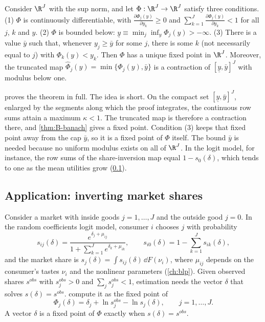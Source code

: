 \begin{theorem}\label{thm:B-blp-contraction}
Consider $\R^J$ with the sup norm, and let $\Phi: \R^J \to \R^J$ satisfy three conditions. (1) $\Phi$ is
continuously differentiable, with $\frac{\partial\Phi_j(y)}{\partial y_k} \geq 0$ and $\sum_{k=1}^{J}
\frac{\partial\Phi_j(y)}{\partial y_k} < 1$ for all $j$, $k$ and $y$. (2) $\Phi$ is bounded below:
$\underline y \equiv \min_j\inf_y\Phi_j(y) > -\infty$. (3) There is a value $\bar y$ such that, whenever $y_j
\geq \bar y$ for some $j$, there is some $k$ (not necessarily equal to $j$) with $\Phi_k(y) < y_k$. Then
$\Phi$ has a unique fixed point in $\R^J$. Moreover, the truncated map $\hat\Phi_j(y) = \min\{\Phi_j(y),
\bar y\}$ is a contraction of $[\underline y, \bar y]^J$ with modulus below one.
\end{theorem}

 proves the theorem in full. The idea is short. On the compact set $[\underline y,
\bar y]^J$, enlarged by the segments along which the proof integrates, the continuous row sums attain a
maximum $\kappa < 1$. The truncated map is therefore a contraction there, and \cref{thm:B-banach} gives a
fixed point. Condition (3) keeps that fixed point away from the cap $\bar y$, so it is a fixed point of
$\Phi$ itself. The bound $\bar y$ is needed because no uniform modulus exists on all of $\R^J$. In the logit
model, for instance, the row sums of the share-inversion map equal $1 - s_0(\delta)$, which tends to one as
the mean utilities grow (\cref{sec:B-inversion}).

\subsection{Application: inverting market shares}\label{sec:B-inversion}

Consider a market with inside goods $j = 1, \dots, J$ and the outside good $j = 0$. In the random
coefficients logit model, consumer $i$ chooses $j$ with probability
\begin{equation*}
  s_{ij}(\delta) = \frac{e^{\delta_j + \mu_{ij}}}{1 + \sum_{k=1}^{J}e^{\delta_k + \mu_{ik}}}, \qquad
  s_{i0}(\delta) = 1 - \sum_{k=1}^{J}s_{ik}(\delta),
\end{equation*}
and the market share is $s_j(\delta) = \int s_{ij}(\delta)\,\dd F(\nu_i)$, where $\mu_{ij}$ depends on the
consumer's tastes $\nu_i$ and the nonlinear parameters (\cref{ch:blp}). Given observed shares $s^{obs}$
with $s^{obs}_j > 0$ and $\sum_js^{obs}_j < 1$, estimation needs the vector $\delta$ that solves $s(\delta) =
s^{obs}$. \citet[eq.~(6.8), p.~865]{BerryLevinsohnPakes1995} compute it as the fixed point of
\begin{equation}\label{eq:B-blp-map}
  \Phi_j(\delta) = \delta_j + \ln s^{obs}_j - \ln s_j(\delta), \qquad j = 1, \dots, J.
\end{equation}
A vector $\delta$ is a fixed point of $\Phi$ exactly when $s(\delta) = s^{obs}$.

